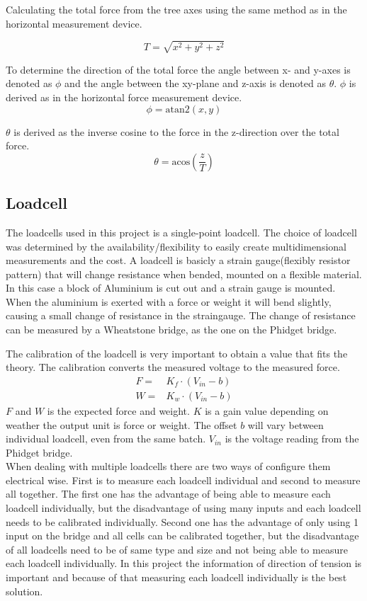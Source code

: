 Calculating the total force from the tree axes using the same method as in the horizontal measurement device.

\begin{equation}
T = \sqrt{x^2+y^2+z^2}
\end{equation} 

To determine the direction of the total force the angle between x- and y-axes is denoted as $\phi$ and the angle between the xy-plane and z-axis is denoted as $\theta$.
$\phi$ is derived as in the horizontal force measurement device.
\begin{equation}
\phi = \mathrm{atan2}(x,y)
\end{equation}

$\theta$ is derived as the inverse cosine to the force in the z-direction over the total force.
\begin{equation}
\theta = \mathrm{acos}\left( \frac{z}{T} \right)
\end{equation}

\subsection{Loadcell}
The loadcells used in this project is a single-point loadcell. The choice of loadcell was determined by the availability/flexibility to easily create multidimensional measurements and the cost. A loadcell is basicly a strain gauge(flexibly resistor pattern) that will change resistance when bended, mounted on a flexible material. In this case a block of Aluminium is cut out and a strain gauge is mounted. When the aluminium is exerted with a force or weight it will bend slightly, causing a small change of resistance in the straingauge. The change of resistance can be measured by a Wheatstone bridge, as the one on the Phidget bridge. 

The calibration of the loadcell is very important to obtain a value that fits the theory. The calibration converts the measured voltage to the measured force.
\begin{eqnarray}
F =& K_f \cdot (V_{in} - b)\\
W =& K_w \cdot (V_{in} - b)
\end{eqnarray}
$F$ and $W$ is the expected force and weight. $K$ is a gain value depending on weather the output unit is force or weight. The offset $b$ will vary between individual loadcell, even from the same batch. $V_{in}$ is the voltage reading from the Phidget bridge.\\
\noindent
When dealing with multiple loadcells there are two ways of configure them electrical wise. First is to measure each loadcell individual and second to measure all together. The first one has the advantage of being able to measure each loadcell individually, but the disadvantage of using many inputs and each loadcell needs to be calibrated individually. Second one has the advantage of only using 1 input on the bridge and all cells can be calibrated together, but the disadvantage of all loadcells need to be of same type and size and not being able to measure each loadcell individually. In this project the information of direction of tension is important and because of that measuring each loadcell individually is the best solution. \cite{PhidgetsInc.2012}

